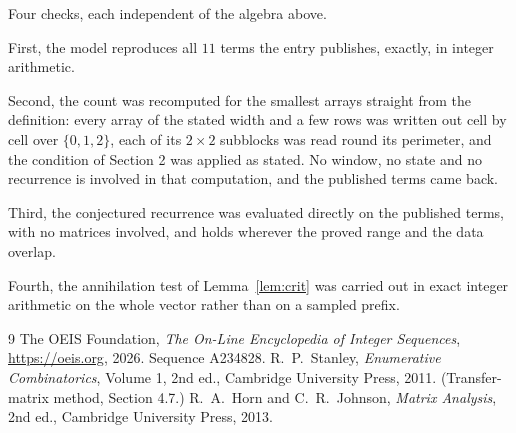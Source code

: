 \documentclass[11pt,a4paper]{article}
\theoremstyle{plain}
\theoremstyle{definition}
\begin{document}
Four checks, each independent of the algebra above.

First, the model reproduces all $11$ terms the entry publishes, exactly, in integer
arithmetic.

Second, the count was recomputed for the smallest arrays straight from the definition: every
array of the stated width and a few rows was written out cell by cell over $\{0,1,2\}$, each of
its $2\times2$ subblocks was read round its perimeter, and the condition of Section 2 was
applied as stated. No window, no state and no recurrence is involved in that computation, and
the published terms came back.

Third, the conjectured recurrence was evaluated directly on the published terms, with no
matrices involved, and holds wherever the proved range and the data overlap.

Fourth, the annihilation test of Lemma~\ref{lem:crit} was carried out in exact integer
arithmetic on the whole vector rather than on a sampled prefix.

\begin{thebibliography}{9}
 The OEIS Foundation, \emph{The On-Line Encyclopedia of Integer
Sequences}, \url{https://oeis.org}, 2026. Sequence A234828.
 R.~P.~Stanley, \emph{Enumerative Combinatorics}, Volume 1, 2nd ed.,
Cambridge University Press, 2011. (Transfer-matrix method, Section 4.7.)
 R.~A.~Horn and C.~R.~Johnson, \emph{Matrix Analysis}, 2nd ed., Cambridge
University Press, 2013.
\end{thebibliography}
\end{document}
